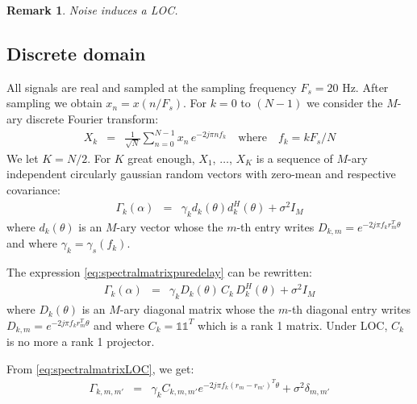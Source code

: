 \documentclass[a4paper, 12pt]{report}
\newcommand{\diag}[1]{\mathrm{diag}\left( #1 \right)}
\newtheorem{remark}{Remark}
\begin{document}
\begin{remark}
Noise induces a LOC.
\end{remark}

\subsection{Discrete domain}

All signals are real and sampled at the sampling frequency  $F_{s}=20$ Hz. After sampling we obtain $x_{n}=x(n/F_{s})$. For $k=0$ to $(N-1)$ we consider the $M$-ary discrete Fourier transform:
 \begin{eqnarray*}
 X_{k}&=&\frac{1}{\sqrt{N}}\sum_{n=0}^{N-1}x_{n}\,e^{-2j\pi n f_{k}}
    \quad\mathrm{where}\quad
 f_{k}=kF_{s}/N
 \end{eqnarray*}
We let $K=N/2$.
For $K$ great enough, $X_{1}$, $\ldots$, $X_{K}$ is a sequence of  $M$-ary independent circularly gaussian random vectors with zero-mean and respective covariance:
\begin{eqnarray}
\label{eq:spectralmatrixpuredelay}
\Gamma_{k}(\alpha)&=&\gamma_{k}d_{k}(\theta)d_{k}^{H}(\theta)+\sigma^{2}I_{M}
\end{eqnarray}
where $d_{k}(\theta)$ is an $M$-ary vector whose the $m$-th entry writes $D_{k,m}=e^{-2j\pi f_{k} r_{m}^{T}\theta }$ and where $\gamma_{k}=\gamma_{s}(f_{k})$.

The expression \eqref{eq:spectralmatrixpuredelay} can be rewritten:
\begin{eqnarray}
\label{eq:spectralmatrixLOC}
\Gamma_{k}(\alpha)&=&\gamma_{k}D_{k}(\theta)\, C_{k}\,D_{k}^{H}(\theta)+\sigma^{2}I_{M}
\end{eqnarray}
where $D_{k}(\theta)$ is an $M$-ary diagonal matrix whose the $m$-th diagonal entry writes $D_{k,m}=e^{-2j\pi f_{k} r_{m}^{T}\theta }$ and where $C_{k}=\mathds{1}\mathds{1}^{T}$ which is a rank 1 matrix. Under LOC, $C_{k}$ is no more a rank 1 projector. 

From \eqref{eq:spectralmatrixLOC}, we get:
\begin{eqnarray*}
 \Gamma_{k,m,m'}&=& \gamma_{k}C_{k,m,m'}e^{-2j\pi f_{k} (r_{m}-r_{m'})^{T}\theta }+\sigma^{2}\delta_{m,m'}
\end{eqnarray*}
\end{document}
